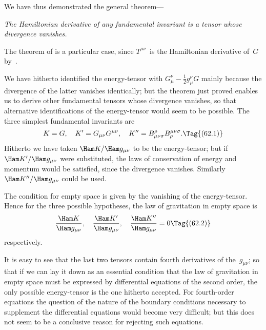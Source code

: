 \documentclass[12pt]{book}
\begin{document}
We have thus demonstrated the general theorem---

\emph{The Hamiltonian derivative of any fundamental invariant is a tensor whose
%
divergence vanishes.}
%

The theorem of  is a particular case, since $T^{\mu\nu}$~is the Hamiltonian
derivative of~$G$ by~.

%
%

We have hitherto identified the energy-tensor with $G_{\mu}^{\nu} - \tfrac{1}{2} g_{\mu}^{\nu}G$ mainly
because the divergence of the latter vanishes identically; but the theorem
just proved enables us to derive other fundamental tensors whose divergence
vanishes, so that alternative identifications of the energy-tensor would seem
to be possible. The three simplest fundamental invariants are
\[
K = G,\quad
K' = G_{\mu\nu} G^{\mu\nu},\quad
K'' = B_{\mu\nu\sigma}^{\rho} B_{\rho}^{\mu\nu\sigma}.
\Tag{(62.1)}
\]
Hitherto we have taken $\Ham K/\Ham g_{\mu\nu}$ to be the energy-tensor; but if $\Ham K'/\Ham g_{\mu\nu}$
were substituted, the laws of conservation of energy and momentum would be
satisfied, since the divergence vanishes. Similarly $\Ham K''/\Ham g_{\mu\nu}$ could be used.

The condition for empty space is given by the vanishing of the energy-tensor.
Hence for the three possible hypotheses, the law of gravitation in
empty space is
\[
\frac{\Ham K}{\Ham g_{\mu\nu}},\quad
\frac{\Ham K'}{\Ham g_{\mu\nu}},\quad
\frac{\Ham K''}{\Ham g_{\mu\nu}} = 0
\Tag{(62.2)}
\]
respectively.

It is easy to see that the last two tensors contain fourth derivatives of the~$g_{\mu\nu}$;
so that if we can lay it down as an essential condition that the law of
gravitation in empty space must be expressed by differential equations of the
second order, the only possible energy-tensor is the one hitherto accepted.
For fourth-order equations the question of the nature of the boundary conditions
necessary to supplement the differential equations would become very
difficult; but this does not seem to be a conclusive reason for rejecting such
equations.
\end{document}
